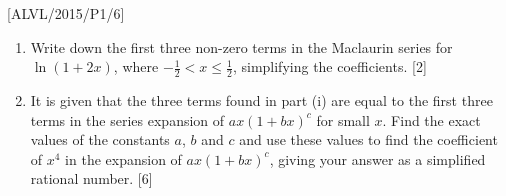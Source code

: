 \item {[}ALVL/2015/P1/6{]}
\begin{enumerate}
\item Write down the first three non-zero terms in the Maclaurin series
for $\ln\left(1+2x\right)$, where $-\frac{1}{2}<x\leq\frac{1}{2}$,
simplifying the coefficients.\hfill{} {[}2{]}
\item It is given that the three terms found in part (i) are equal to the
first three terms in the series expansion of $ax\left(1+bx\right)^{c}$
for small $x$. Find the exact values of the constants $a$, $b$
and $c$ and use these values to find the coefficient of $x^{4}$
in the expansion of $ax\left(1+bx\right)^{c}$, giving your answer
as a simplified rational number. \hfill{}{[}6{]}
\end{enumerate}
